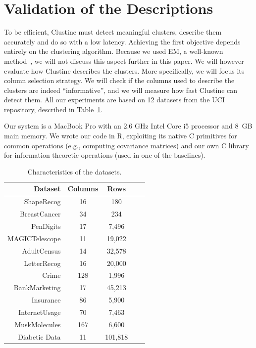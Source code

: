 \section{Validation of the Descriptions}
\label{sec:eval}
To be efficient, Clustine must detect meaningful clusters, describe them
accurately and do so with a low latency.  Achie\-ving the first objective
depends entirely on the clustering algorithm.  Because we used EM, a well-known
method~\cite{bishop2001bishop}, we will not discuss this aspect further in this
paper. We will however evaluate how Clustine describes the clusters. More
specifically, we will focus its column selection strategy. We will check if the
columns used to describe the clusters are indeed ``informative'', and we will
measure how fast Clustine can detect them. All our  experiments are based on 12
datasets from the UCI repository, described in Table~\ref{tab:datasets}.

Our system is a MacBook Pro with an 2.6 GHz Intel Core i5 processor and 8~GB
main memory. We wrote our code in R, exploiting its native C primitives for
common operations (e.g., computing covariance matrices) and our own C library
for information theoretic operations (used in one of the baselines).

\begin{table}[!t]
    \centering
    \scriptsize
    \begin{tabular}{r c c c c} 
        \hline
        Dataset & Columns & Rows\\
        \hline
        ShapeRecog & 16 & 180\\
        BreastCancer & 34 & 234\\
        PenDigits & 17 & 7,496\\
        MAGICTelescope & 11 & 19,022\\
        AdultCensus & 14 & 32,578\\
        LetterRecog & 16 & 20,000\\
        Crime & 128 & 1,996\\
        BankMarketing & 17 & 45,213\\
        Insurance & 86 & 5,900\\
        InternetUsage & 70 & 7,463\\
        MuskMolecules & 167 & 6,600\\
        Diabetic Data & 11 & 101,818\\
        \hline
    \end{tabular}
    \caption{Characteristics of the datasets.}
    \label{tab:datasets}
\end{table}



